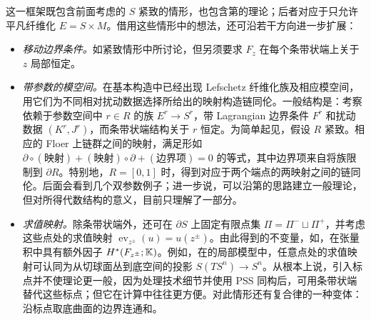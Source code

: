这一框架既包含前面考虑的 $S$ 紧致的情形，也包含第的理论；后者对应于只允许平凡纤维化 $E=S\times M$。借用这些情形中的想法，还可沿若干方向进一步扩展：
\begin{itemize}
\item \emph{移动边界条件。}如紧致情形中所讨论，但另须要求 $F_z$ 在每个条带状端上关于 $z$ 局部恒定。
\item \emph{带参数的模空间。}在基本构造中已经出现 Lefschetz 纤维化族及相应模空间，用它们为不同相对扰动数据选择所给出的映射构造链同伦。一般结构是：考察依赖于参数空间中 $r\in R$ 的族 $E^r\to S^r$，带 Lagrangian 边界条件 $F^r$ 和扰动数据 $(K^r,J^r)$，而条带状端结构关于 $r$ 恒定。为简单起见，假设 $R$ 紧致。相应的 Floer 上链群之间的映射，满足形如 $\partial\circ(\text{映射})+(\text{映射})\circ\partial+(\text{边界项})=0$ 的等式，其中边界项来自将族限制到 $\partial R$。特别地，$R=[0,1]$ 时，得到对应于两个端点的两映射之间的链同伦。后面会看到几个双参数例子；进一步说，可以沿第的思路建立一般理论，但对所得代数结构的意义，目前只理解了一部分。
\item \emph{求值映射。}除条带状端外，还可在 $\partial S$ 上固定有限点集 $\Pi=\Pi^-\sqcup\Pi^+$，并考虑这些点处的求值映射 $\operatorname{ev}_{z^\pm}(u)=u(z^\pm)$。由此得到的不变量，如，在张量积中具有额外因子 $H^*(F_{z^\pm};\mathbb K)$。例如，在的局部模型中，任意点处的求值映射可认同为从切球面丛到底空间的投影 $S(TS^n)\to S^n$。从根本上说，引入标点并不使理论更一般，因为处理技术细节并使用 PSS 同构后，可用条带状端替代这些标点；但它在计算中往往更方便。对此情形还有复合律的一种变体：沿标点取底曲面的边界连通和。
\end{itemize}

